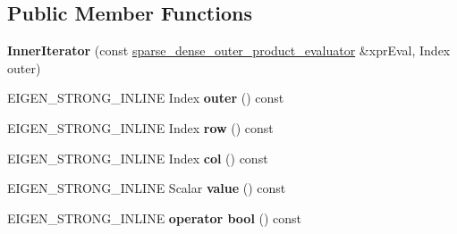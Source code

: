 \subsection*{Public Member Functions}
\begin{DoxyCompactItemize}
\item 
\mbox{\label{class_eigen_1_1internal_1_1sparse__dense__outer__product__evaluator_1_1_inner_iterator_a27bb5136a9ef5370c7ddfc34ddc11999}} 
{\bfseries Inner\+Iterator} (const \mbox{\hyperlink{struct_eigen_1_1internal_1_1sparse__dense__outer__product__evaluator}{sparse\+\_\+dense\+\_\+outer\+\_\+product\+\_\+evaluator}} \&xpr\+Eval, Index outer)
\item 
\mbox{\label{class_eigen_1_1internal_1_1sparse__dense__outer__product__evaluator_1_1_inner_iterator_a18b2d7ab3c90d856a45862d0e62d5728}} 
E\+I\+G\+E\+N\+\_\+\+S\+T\+R\+O\+N\+G\+\_\+\+I\+N\+L\+I\+NE Index {\bfseries outer} () const
\item 
\mbox{\label{class_eigen_1_1internal_1_1sparse__dense__outer__product__evaluator_1_1_inner_iterator_ac58c9e2ff400cb2741d955912f0068df}} 
E\+I\+G\+E\+N\+\_\+\+S\+T\+R\+O\+N\+G\+\_\+\+I\+N\+L\+I\+NE Index {\bfseries row} () const
\item 
\mbox{\label{class_eigen_1_1internal_1_1sparse__dense__outer__product__evaluator_1_1_inner_iterator_a484b491863396b0585940f6ffadcedd2}} 
E\+I\+G\+E\+N\+\_\+\+S\+T\+R\+O\+N\+G\+\_\+\+I\+N\+L\+I\+NE Index {\bfseries col} () const
\item 
\mbox{\label{class_eigen_1_1internal_1_1sparse__dense__outer__product__evaluator_1_1_inner_iterator_a26f411b74ba4a10ae4d254423c0b800a}} 
E\+I\+G\+E\+N\+\_\+\+S\+T\+R\+O\+N\+G\+\_\+\+I\+N\+L\+I\+NE Scalar {\bfseries value} () const
\item 
\mbox{\label{class_eigen_1_1internal_1_1sparse__dense__outer__product__evaluator_1_1_inner_iterator_a6545d91d6a5132f8ad80f0a34e854fb2}} 
E\+I\+G\+E\+N\+\_\+\+S\+T\+R\+O\+N\+G\+\_\+\+I\+N\+L\+I\+NE {\bfseries operator bool} () const
\end{DoxyCompactItemize}
